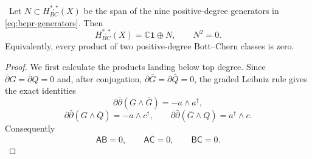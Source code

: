 \begin{theorem}
\label{thm:bcpr-square-zero-algebra}
\Verified\ Let $N\subset H^{*,*}_{BC}(X)$ be the span of the nine positive-degree
generators in \cref{eq:bcpr-generators}.  Then
\begin{equation}
 H^{*,*}_{BC}(X)=\mathbb C\mathbf1\oplus N,
 \qquad N^2=0.
\label{eq:bcpr-algebra}
\end{equation}
Equivalently, every product of two positive-degree Bott--Chern classes is
zero.
\end{theorem}

\begin{proof}
We first calculate the products landing below top degree.  Since
$\bar\partial G=\bar\partial Q=0$ and, after conjugation,
$\partial\bar G=\partial\bar Q=0$, the graded Leibniz rule gives the exact
identities
\begin{equation}
 \partial\bar\partial(G\wedge\bar G)
 =-a\wedge a^\dagger,
\label{eq:bcpr-product-ab}
\end{equation}
\begin{equation}
 \partial\bar\partial(G\wedge\bar Q)
 =-a\wedge c^\dagger,
 \qquad
 \partial\bar\partial(\bar G\wedge Q)
 =a^\dagger\wedge c.
\label{eq:bcpr-product-acbar-bc}
\end{equation}
Consequently
\begin{equation}
 \mathsf A\mathsf B=0,\qquad
 \mathsf A\overline{\mathsf C}=0,\qquad
 \mathsf B\mathsf C=0.
\label{eq:bcpr-first-zero-products}
\end{equation}


\end{proof}
